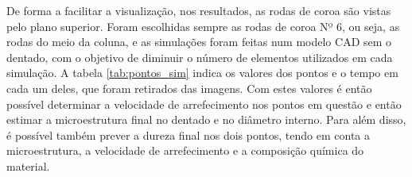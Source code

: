 De forma a facilitar a visualização, nos resultados, as rodas de coroa são vistas pelo plano superior. Foram escolhidas sempre as rodas de coroa Nº 6, ou seja, as rodas do meio da coluna, e as simulações foram feitas num modelo CAD sem o dentado, com o objetivo de diminuir o número de elementos utilizados em cada simulação. A tabela \ref{tab:pontos_sim} indica os valores dos pontos e o tempo em cada um deles, que foram retirados das imagens. Com estes valores é então possível determinar a velocidade de arrefecimento nos pontos em questão e então estimar a microestrutura final no dentado e no diâmetro interno. Para além disso, é possível também prever a dureza final nos dois pontos, tendo em conta a microestrutura, a velocidade de arrefecimento e a composição química do material.
\newpage
